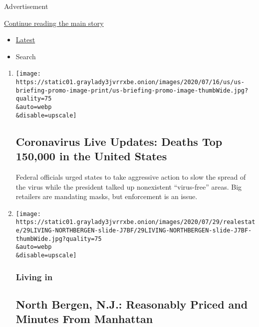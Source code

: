 Advertisement

\protect\hyperlink{after-mid1}{Continue reading the main story}

\begin{itemize}
\tightlist
\item
  \protect\hyperlink{stream-panel}{Latest}
\item
  Search
\end{itemize}

\begin{enumerate}
\def\labelenumi{\arabic{enumi}.}
\item
  \href{/2020/07/29/world/coronavirus-covid-19.html}{}

  \texttt{[image: https://static01.graylady3jvrrxbe.onion/images/2020/07/16/us/us-briefing-promo-image-print/us-briefing-promo-image-thumbWide.jpg?quality=75\\\&auto=webp\\\&disable=upscale]}

  \hypertarget{coronavirus-live-updates-deaths-top-150000-in-the-united-states}{%
  \subsection{Coronavirus Live Updates: Deaths Top 150,000 in the United
  States}\label{coronavirus-live-updates-deaths-top-150000-in-the-united-states}}

  Federal officials urged states to take aggressive action to slow the
  spread of the virus while the president talked up nonexistent
  ``virus-free'' areas. Big retailers are mandating masks, but
  enforcement is an issue.
\item
  \href{/2020/07/29/realestate/north-bergen-nj-reasonably-priced-and-minutes-from-manhattan.html}{}

  \texttt{[image: https://static01.graylady3jvrrxbe.onion/images/2020/07/29/realestate/29LIVING-NORTHBERGEN-slide-J7BF/29LIVING-NORTHBERGEN-slide-J7BF-thumbWide.jpg?quality=75\\\&auto=webp\\\&disable=upscale]}

  \hypertarget{living-in}{%
  \subsubsection{Living in}\label{living-in}}

  \hypertarget{north-bergen-nj-reasonably-priced-and-minutes-from-manhattan}{%
  \subsection{North Bergen, N.J.: Reasonably Priced and Minutes From
  Manhattan}\label{north-bergen-nj-reasonably-priced-and-minutes-from-manhattan}}


\end{enumerate}
